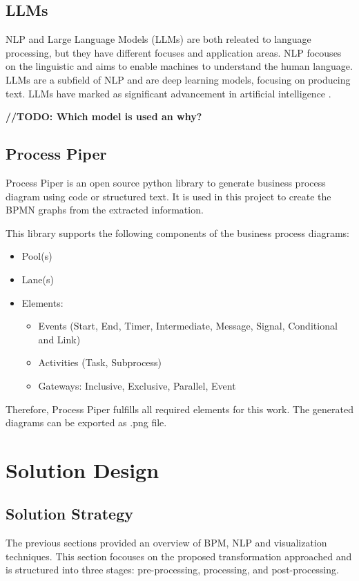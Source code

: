 \section{LLMs}
NLP and Large Language Models (LLMs) are both releated to language processing, but they have different focuses and application areas. NLP focouses on the linguistic and aims to enable machines to understand the human language. LLMs are a subfield of NLP and are deep learning models, focusing on producing text.  LLMs have marked as significant advancement in artificial intelligence \cite{zhangLargeLanguageModels2023}.

\textbf{//TODO: Which model is used an why?}

\section{Process Piper}
Process Piper is an open source python library to generate business process diagram using code or structured text. It is used in this project to create the BPMN graphs from the extracted information.

This library supports the following components of the business process diagrams:
\begin{itemize}
    \item Pool(s)
    \item Lane(s)
    \item Elements:
    \begin{itemize}
        \item Events  (Start, End, Timer, Intermediate, Message, Signal, Conditional and Link)
    \end{itemize}
    \begin{itemize}
        \item Activities (Task, Subprocess)
        \item Gateways: Inclusive, Exclusive, Parallel, Event
    \end{itemize}
\end{itemize}
Therefore, Process Piper fulfills all required elements for this work. The generated diagrams can be exported as .png file.


\newpage

\chapter{Solution Design}
\label{sec:solution}
\section{Solution Strategy}
The previous sections provided an overview of BPM, NLP and visualization techniques. This section focouses on the proposed transformation approached and is structured into three stages: pre-processing, processing, and post-processing. 

